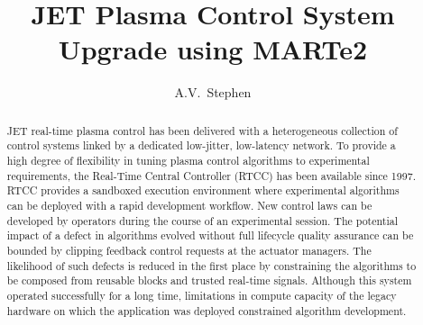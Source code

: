 \documentclass[preprint,12pt]{elsarticle}
\begin{document}
\begin{frontmatter}



\title{JET Plasma Control System Upgrade using MARTe2}


\author{A.V.~Stephen} %


\begin{abstract}

JET real-time plasma control has been delivered with a heterogeneous collection of control systems linked by a dedicated low-jitter, low-latency network. To provide a high degree of flexibility in tuning plasma control algorithms to experimental requirements, the Real-Time Central Controller (RTCC) has been available since 1997. RTCC provides a sandboxed execution environment where experimental algorithms can be deployed with a rapid development workflow. New control laws can be developed by operators during the course of an experimental session. The potential impact of a defect in algorithms evolved without full lifecycle quality assurance can be bounded by clipping feedback control requests at the actuator managers. The likelihood of such defects is reduced in the first place by constraining the algorithms to be composed from reusable blocks and trusted real-time signals. Although this system operated successfully for a long time, limitations in compute capacity of the legacy hardware on which the application was deployed constrained algorithm development.


\end{abstract}
\end{frontmatter}
\end{document}
